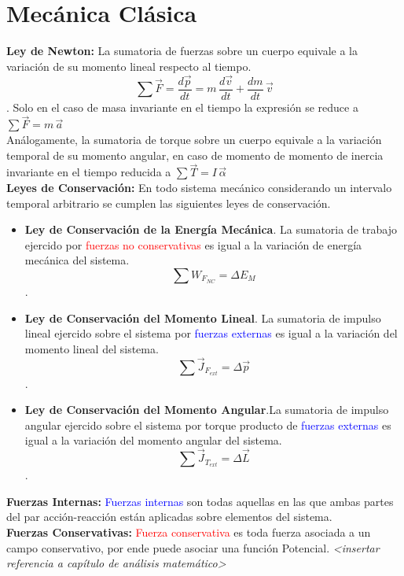 \documentclass[12pt,a4paper]{article}
\begin{document}
\section{Mecánica Clásica}
\textbf{Ley de Newton:} La sumatoria de fuerzas sobre un cuerpo equivale a la variación de su momento lineal respecto al tiempo.\\
$$\sum{\vec{F}} = \dfrac{d\vec{p}}{dt} = m \, \dfrac{d\vec{v}}{dt} + \dfrac{dm}{dt} \, \vec{v}$$.
Solo en el caso de masa invariante en el tiempo la expresión se reduce a $\sum {\vec{F}} = m \, \vec{a}$\\

Análogamente, la sumatoria de torque sobre un cuerpo equivale a la variación temporal de su momento angular, en caso de momento de momento de inercia invariante en el tiempo reducida a $\sum {\vec{T}} = I \, \vec{\alpha}$\\



\textbf{Leyes de Conservación:} En todo sistema mecánico considerando un intervalo temporal arbitrario se cumplen las siguientes leyes de conservación.
\begin{itemize}
	\item \textbf{Ley de Conservación de la Energía Mecánica}. La sumatoria de trabajo ejercido por \textcolor{red}{fuerzas no conservativas} es igual a la variación de energía mecánica del sistema. $$\sum{W_{F_{NC}}} = \Delta E_M$$.
	\item \textbf{Ley de Conservación del Momento Lineal}. La sumatoria de impulso lineal ejercido sobre el sistema por \textcolor{blue}{fuerzas externas} es igual a la variación del momento lineal del sistema. $$\sum{\vec{J}_{F_{ext}}} = \Delta \vec{p}$$.
	\item \textbf{Ley de Conservación del Momento Angular}.La sumatoria de impulso angular ejercido sobre el sistema por torque producto de \textcolor{blue}{fuerzas externas} es igual a la variación del momento angular del sistema.
	$$\sum{\vec{J}_{T_{ext}}} = \Delta \vec{L}$$.
\end{itemize}

\textbf{Fuerzas Internas:} \textcolor{blue}{Fuerzas internas} son todas aquellas en las que ambas partes del par acción-reacción están aplicadas sobre elementos del sistema.\\

\textbf{Fuerzas Conservativas:} \textcolor{red}{Fuerza conservativa} es toda fuerza asociada a un campo conservativo, por ende puede asociar una función Potencial. \textit{<insertar referencia a capítulo de análisis matemático>}\\
\end{document}
